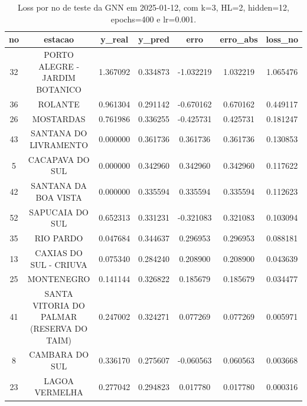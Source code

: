 \begin{table}[h]
\centering
\caption{Loss por no de teste da GNN em 2025-01-12, com k=3, HL=2, hidden=12, epochs=400 e lr=0.001.}
\label{tab:gnn_loss_k3_hl2_h12_e400_d20250112}
\begin{tabular}{ccccccc}
\toprule
no & estacao & y\_real & y\_pred & erro & erro\_abs & loss\_no \\
\midrule
32 & PORTO ALEGRE - JARDIM BOTANICO & 1.367092 & 0.334873 & -1.032219 & 1.032219 & 1.065476 \\
36 & ROLANTE & 0.961304 & 0.291142 & -0.670162 & 0.670162 & 0.449117 \\
26 & MOSTARDAS & 0.761986 & 0.336255 & -0.425731 & 0.425731 & 0.181247 \\
43 & SANTANA DO LIVRAMENTO & 0.000000 & 0.361736 & 0.361736 & 0.361736 & 0.130853 \\
5 & CACAPAVA DO SUL & 0.000000 & 0.342960 & 0.342960 & 0.342960 & 0.117622 \\
42 & SANTANA DA BOA VISTA & 0.000000 & 0.335594 & 0.335594 & 0.335594 & 0.112623 \\
52 & SAPUCAIA DO SUL & 0.652313 & 0.331231 & -0.321083 & 0.321083 & 0.103094 \\
35 & RIO PARDO & 0.047684 & 0.344637 & 0.296953 & 0.296953 & 0.088181 \\
13 & CAXIAS DO SUL - CRIUVA & 0.075340 & 0.284240 & 0.208900 & 0.208900 & 0.043639 \\
25 & MONTENEGRO & 0.141144 & 0.326822 & 0.185679 & 0.185679 & 0.034477 \\
41 & SANTA VITORIA DO PALMAR (RESERVA DO TAIM) & 0.247002 & 0.324271 & 0.077269 & 0.077269 & 0.005971 \\
8 & CAMBARA DO SUL & 0.336170 & 0.275607 & -0.060563 & 0.060563 & 0.003668 \\
23 & LAGOA VERMELHA & 0.277042 & 0.294823 & 0.017780 & 0.017780 & 0.000316 \\
\bottomrule
\end{tabular}
\end{table}
